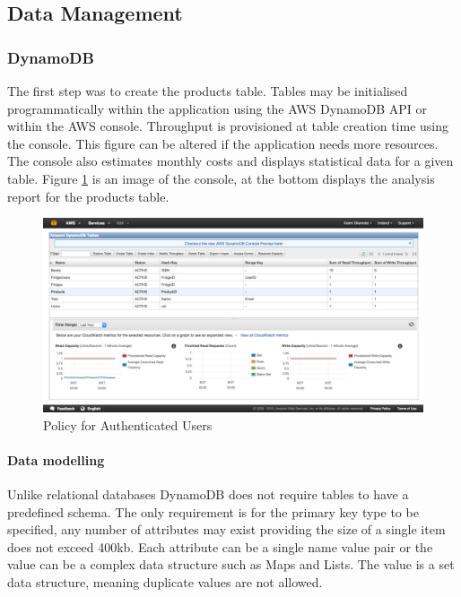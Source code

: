 \documentclass[a4paper, 11pt]{article}
\begin{document}
\subsection{Data Management}
\subsubsection{DynamoDB}
The first step was to create the products table. Tables may be initialised programmatically within the application using the AWS DynamoDB API or within the AWS console. Throughput is provisioned at table creation time using the console. This figure can be altered if the application needs more resources. The console also estimates monthly costs and displays statistical data for a given table. Figure \ref{fig:dynamoConsole} is an image of the console, at the bottom displays the analysis report for the products table.


\vspace{\baselineskip}

\begin{figure}[!htbp]
\centering
\includegraphics[width=\textwidth]{dynamoConsole}
\caption{Policy for Authenticated Users}\label{fig:dynamoConsole}
\end{figure}

\paragraph{Data modelling} Unlike relational databases DynamoDB does not require tables to have a predefined schema. The only requirement is for the primary key type to be specified, any number of attributes may exist providing the size of a single item does not exceed 400kb. Each attribute can be a single name value pair or the value can be a complex data structure such as Maps and Lists. The value is a set data structure, meaning duplicate values are not allowed. 
\end{document}
